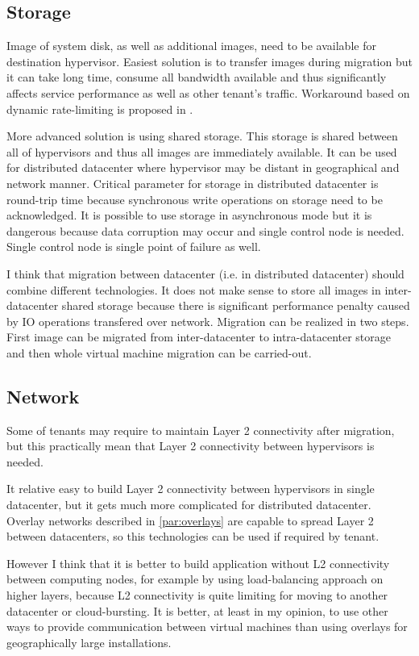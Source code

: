 \subsection{Storage}
Image of system disk, as well as additional images, need to be available for destination hypervisor. Easiest solution is to transfer images during migration but it can take long time, consume all bandwidth available and thus significantly affects service performance as well as other tenant's traffic. Workaround based on dynamic rate-limiting is proposed in \cite{live-migration-of-vms}.

More advanced solution is using shared storage. This storage is shared between all of hypervisors and thus all images are immediately available. It can be used for distributed datacenter where hypervisor may be distant in geographical and network manner. Critical parameter for storage in distributed datacenter is round-trip time because synchronous write operations on storage need to be acknowledged. It is possible to use storage in asynchronous mode but it is dangerous because data corruption may occur and single control node is needed. Single control node is single point of failure as well. 

I think that migration between datacenter (i.e. in distributed datacenter) should combine different technologies. It does not make sense to store all images in inter-datacenter shared storage because there is significant performance penalty caused by \Ac{IO} operations transfered over network. Migration can be realized in two steps. First image can be migrated from inter-datacenter to intra-datacenter storage and then whole virtual machine migration can be carried-out.

\subsection{Network}
Some of tenants may require to maintain Layer 2 connectivity after migration, but this practically mean that Layer 2 connectivity between hypervisors is needed. 

It relative easy to build Layer 2 connectivity between hypervisors in single datacenter, but it gets much more complicated for distributed datacenter. Overlay networks described in \ref{par:overlays} are capable to spread Layer 2 between datacenters, so this technologies can be used if required by tenant. 

However I think that it is better to build application without L2 connectivity between computing nodes, for example by using load-balancing approach on higher layers, because L2 connectivity is quite limiting for moving to another datacenter or cloud-bursting. It is better, at least in my opinion, to use other ways to provide communication between virtual machines than using overlays for geographically large installations.

